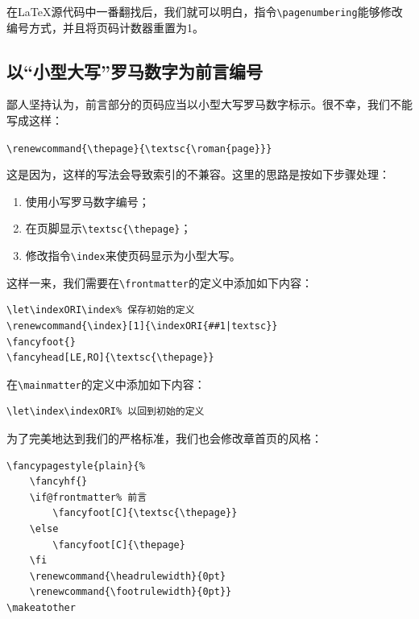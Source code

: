 在\LaTeX 源代码中一番翻找后，我们就可以明白，指令\verb|\pagenumbering|能够修改编号方式，并且将页码计数器重置为1。

%
%
\fancyhf{}
\fancyhead[LE]{\bfseries\thepage}
\fancyhead[RO]{\bfseries\thepage}
\fancyhead[LO]{\bfseries\rightmark}
\fancyhead[RE]{\bfseries\leftmark}
\renewcommand{\footrulewidth}{0pt}

\subsection{以“小型大写”罗马数字为前言编号}

鄙人坚持认为，前言部分的页码应当以小型大写罗马数字标示。很不幸，我们不能写成这样：

\begin{dmd}
\verb|\renewcommand{\thepage}{\textsc{\roman{page}}}|
\end{dmd}

这是因为，这样的写法会导致索引的不兼容。这里的思路是按如下步骤处理：

\begin{enumerate}
    \item 使用小写罗马数字编号；
    \item 在页脚显示\verb|\textsc{\thepage}|；
    \item 修改指令\verb|\index|来使页码显示为小型大写。
\end{enumerate}

这样一来，我们需要在\verb|\frontmatter|的定义中添加如下内容：

\begin{dmd}
\begin{verbatim}
\let\indexORI\index% 保存初始的定义
\renewcommand{\index}[1]{\indexORI{##1|textsc}} 
\fancyfoot{}
\fancyhead[LE,RO]{\textsc{\thepage}}
\end{verbatim}
\end{dmd}

在\verb|\mainmatter|的定义中添加如下内容：

\begin{dmd}
\begin{verbatim}
\let\index\indexORI% 以回到初始的定义
\end{verbatim}
\end{dmd}

为了完美地达到我们的严格标准，我们也会修改章首页的风格：

\begin{dmd}
\begin{verbatim}
\fancypagestyle{plain}{% 
    \fancyhf{}
    \if@frontmatter% 前言
        \fancyfoot[C]{\textsc{\thepage}}
    \else
        \fancyfoot[C]{\thepage}
    \fi
    \renewcommand{\headrulewidth}{0pt}
    \renewcommand{\footrulewidth}{0pt}}
\makeatother
\end{verbatim}
\end{dmd}

